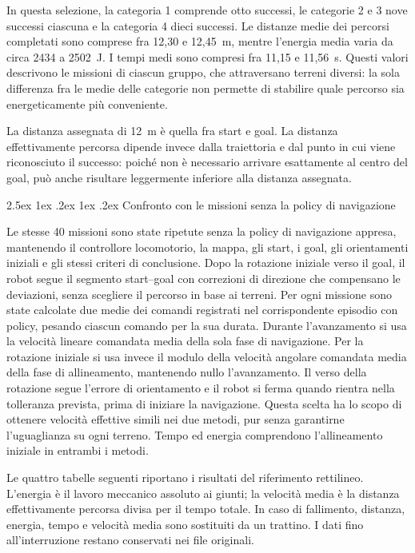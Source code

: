\documentclass[11pt,a4paper]{article}
\makeatletter
\newcommand{\subsubsubsection}{%
  \@startsection{paragraph}{4}{\z@}%
  {2.5ex \@plus 1ex \@minus .2ex}%
  {1ex \@plus .2ex}%
  {\normalfont\normalsize\bfseries}}
\makeatother
\begin{document}


In questa selezione, la categoria 1 comprende otto successi, le categorie 2 e 3 nove successi ciascuna e la categoria 4 dieci successi. Le distanze medie dei percorsi completati sono comprese fra 12,30 e 12,45~m, mentre l'energia media varia da circa 2434 a 2502~J. I tempi medi sono compresi fra 11,15 e 11,56~s. Questi valori descrivono le missioni di ciascun gruppo, che attraversano terreni diversi: la sola differenza fra le medie delle categorie non permette di stabilire quale percorso sia energeticamente più conveniente.

La distanza assegnata di 12~m è quella fra start e goal.
La distanza effettivamente percorsa dipende invece dalla traiettoria e dal punto in cui viene riconosciuto il successo: poiché non è necessario arrivare esattamente al centro del goal, può anche risultare leggermente inferiore alla distanza assegnata.

\subsubsubsection{Confronto con le missioni senza la policy di navigazione}


Le stesse 40 missioni sono state ripetute senza la policy di navigazione appresa, mantenendo il controllore locomotorio, la mappa, gli start, i goal, gli orientamenti iniziali e gli stessi criteri di conclusione. Dopo la rotazione iniziale verso il goal, il robot segue il segmento start--goal con correzioni di direzione che compensano le deviazioni, senza scegliere il percorso in base ai terreni. Per ogni missione sono state calcolate due medie dei comandi registrati nel corrispondente episodio con policy, pesando ciascun comando per la sua durata. Durante l'avanzamento si usa la velocità lineare comandata media della sola fase di navigazione. Per la rotazione iniziale si usa invece il modulo della velocità angolare comandata media della fase di allineamento, mantenendo nullo l'avanzamento. Il verso della rotazione segue l'errore di orientamento e il robot si ferma quando rientra nella tolleranza prevista, prima di iniziare la navigazione. Questa scelta ha lo scopo di ottenere velocità effettive simili nei due metodi, pur senza garantirne l'uguaglianza su ogni terreno. Tempo ed energia comprendono l'allineamento iniziale in entrambi i metodi.

Le quattro tabelle seguenti riportano i risultati del riferimento rettilineo. L'energia è il lavoro meccanico assoluto ai giunti; la velocità media è la distanza effettivamente percorsa divisa per il tempo totale. In caso di fallimento, distanza, energia, tempo e velocità media sono sostituiti da un trattino. I dati fino all'interruzione restano conservati nei file originali.
\end{document}
